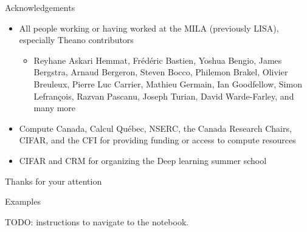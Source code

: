 \documentclass[a4paper,9pt]{beamer}
\begin{document}
\begin{frame}{Acknowledgements}
  \begin{itemize}
    \item All people working or having worked at the MILA (previously LISA), especially Theano contributors
      \begin{itemize}
        \item
          Reyhane Askari Hemmat,
          Frédéric Bastien,
          Yoshua Bengio,
          James Bergstra,
          Arnaud Bergeron,
          Steven Bocco,
          Philemon Brakel,
          Olivier Breuleux,
          Pierre Luc Carrier,
          Mathieu Germain,
          Ian Goodfellow,
          Simon Lefrançois,
          Razvan Pascanu,
          Joseph Turian,
          David Warde-Farley,
          and many more
      \end{itemize}
    \item Compute Canada, Calcul Québec, NSERC, the Canada Research Chairs, CIFAR, and the CFI for providing funding or access to compute resources
    \item CIFAR and CRM for organizing the Deep learning summer school
  \end{itemize}
\end{frame}

\begin{frame}[fragile]{Thanks for your attention}
  \vspace{.5cm}


  \vspace{.5cm}
\end{frame}

\begin{frame}[fragile]{Examples}

  TODO: instructions to navigate to the notebook.
\end{frame}
\end{document}
